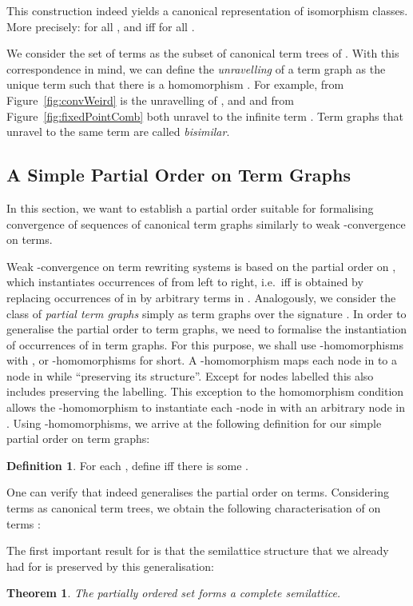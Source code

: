 \documentclass[copyright,creativecommons,UKenglish,final]{eptcs}
\theoremstyle{definition}
\newtheorem{definition}{Definition}[section]
\theoremstyle{plain}
\newtheorem{theorem}{Theorem}[section]
\begin{document}
This construction indeed yields a canonical representation of
isomorphism classes. More precisely:  for all
, and  iff  for all
.

We consider the set of terms  as the subset of canonical term
trees of .  With this correspondence in mind, we can
define the \emph{unravelling} of a term graph  as the unique term
 such that there is a homomorphism . For example,  from Figure~\ref{fig:convWeird} is the
unravelling of , and  and  from
Figure~\ref{fig:fixedPointComb} both unravel to the infinite term
. Term graphs that unravel to the same term are
called \emph{bisimilar}.




\subsection{A Simple Partial Order on Term Graphs}
\label{sec:simple-partial-order}

In this section, we want to establish a partial order suitable for
formalising convergence of sequences of canonical term graphs
similarly to weak -convergence on terms.


Weak -convergence on term rewriting systems is based on the
partial order  on , which instantiates occurrences
of  from left to right, i.e.\  iff  is obtained
by replacing occurrences of  in  by arbitrary terms in
.  Analogously, we consider the class of \emph{partial term
  graphs} simply as term graphs over the signature . In order to generalise the partial order
 to term graphs, we need to formalise the instantiation of
occurrences of  in term graphs. For this purpose, we shall use
-homomorphisms with , or -homomorphisms
for short. A -homomorphism  maps each
node in  to a node in  while ``preserving its
structure''. Except for nodes labelled  this also includes
preserving the labelling. This exception to the homomorphism condition
allows the -homomorphism  to instantiate each -node
in  with an arbitrary node in .  Using -homomorphisms, we
arrive at the following definition for our simple partial order
 on term graphs:
\begin{definition}For each , define  iff there is
  some .
\end{definition}

One can verify that  indeed generalises the partial order
 on terms. Considering terms as canonical term trees, we
obtain the following characterisation of  on terms :


The first important result for  is that the semilattice
structure that we already had for  is preserved by this
generalisation:
\begin{theorem}
  \label{thr:complSemilattice}
  The partially ordered set  forms a complete
  semilattice.
\end{theorem}
\end{document}

